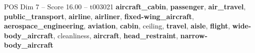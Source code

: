 \begin{textsample}{POS Dim 7 – Score 16.00 – t003021}  \label{ex:f7_pos_030}
\textbf{aircraft\_cabin}, \textbf{passenger}, \textbf{air\_travel}, \textbf{public\_transport}, \textbf{airline}, \textbf{airliner}, \textbf{fixed-wing\_aircraft}, \textbf{aerospace\_engineering}, \textbf{aviation}, \textbf{cabin}, ceiling, \textbf{travel}, \textbf{aisle}, \textbf{flight}, \textbf{wide-body\_aircraft}, cleanliness, \textbf{aircraft}, \textbf{head\_restraint}, \textbf{narrow-body\_aircraft}

\end{textsample}
